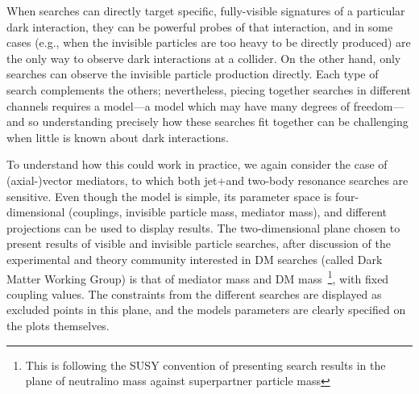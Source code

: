 When searches can directly target specific, fully-visible signatures of a particular dark interaction, they can be powerful probes of that interaction, and in some cases (e.g., when the invisible particles are too heavy to be directly produced) are the only way to observe dark interactions at a collider. On the other hand, only \MET searches can observe the invisible particle production directly. Each type of search complements the others; nevertheless, piecing together searches in different channels requires a model---a model which may have many degrees of freedom---and so understanding precisely how these searches fit together can be challenging when little is known about dark interactions.

To understand how this could work in practice, we again consider the case of (axial-)vector mediators, to which both jet+\MET and two-body resonance searches are sensitive. Even though the model is simple, its parameter space is four-dimensional (couplings, invisible particle mass, mediator mass), and different projections can be used to display results. The two-dimensional plane chosen to present results of visible and invisible particle searches, after discussion of the experimental and theory community interested in DM searches (called Dark Matter Working Group) is that of mediator mass and DM mass~\footnote{This is following the SUSY convention of presenting search results in the plane of neutralino mass against superpartner particle mass}, with fixed coupling values. The constraints from the different searches are displayed as excluded points in this plane, and the models parameters are clearly specified on the plots themselves.  

